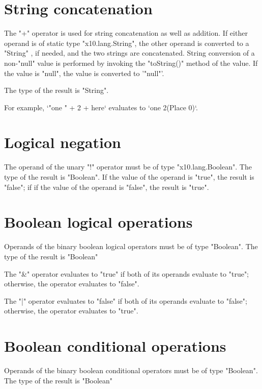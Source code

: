 \section{String concatenation}

The \xcd"+"  operator is used for string concatenation 
 as well as addition.
If either operand is of static type \xcd"x10.lang.String",
 the other operand is converted to a \xcd"String" , if needed,
  and  the two strings  are concatenated.
 String conversion of a non-\xcd"null" value is  performed by invoking the
 \xcd"toString()" method of the value.
  If the value is \xcd"null", the value is converted to 
  \xcd'"null"'.

The type of the result is \xcd"String".

 For example, 
      \xcd`"one " + 2 + here` 
      evaluates to  \xcd`one 2(Place 0)`.  

\section{Logical negation}

The operand of the  unary \xcd"!" operator 
must be of type \xcd"x10.lang.Boolean".
The type of the result is \xcd"Boolean".
If the value of the operand is \xcd"true", the result is \xcd"false"; if
if the value of the operand  is \xcd"false", the result is \xcd"true".

\section{Boolean logical operations}

Operands of the binary boolean logical operators must be of type \xcd"Boolean".
The type of the result is \xcd"Boolean"

The \xcd"&" operator  evaluates to \xcd"true" if both of its
operands evaluate to \xcd"true"; otherwise, the operator
evaluates to \xcd"false".

The \xcd"|" operator  evaluates to \xcd"false" if both of its
operands evaluate to \xcd"false"; otherwise, the operator
evaluates to \xcd"true".

\section{Boolean conditional operations}

Operands of the binary boolean conditional operators must be of type
\xcd"Boolean". 
The type of the result is \xcd"Boolean"

